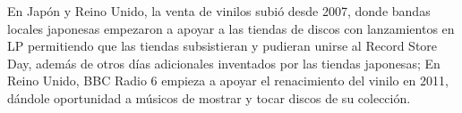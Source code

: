 \documentclass{article}
\begin{document}
\endgroup

En Japón y Reino Unido, la venta de vinilos subió desde 2007, donde bandas locales japonesas empezaron a apoyar a las tiendas de discos con lanzamientos en LP permitiendo que las tiendas subsistieran y pudieran unirse al Record Store Day, además de otros días adicionales inventados por las tiendas japonesas; En Reino Unido, BBC Radio 6 empieza a apoyar el renacimiento del vinilo en 2011, dándole oportunidad a músicos de mostrar y tocar discos de su colección.\cite{wikirevival}

\begin{table}[h]
    \centering
\end{table}
\end{document}
